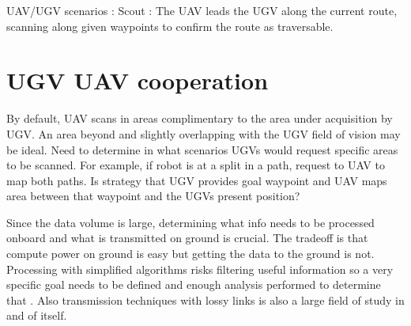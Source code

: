 \documentclass[a4paper,11pt]{report}
\begin{document}
UAV/UGV scenarios :
Scout : The UAV leads the UGV along the current route, scanning along given waypoints to confirm the route as traversable. 

\section{UGV UAV cooperation}

By default, UAV scans in areas complimentary to the area under acquisition by UGV. An area beyond and slightly overlapping with the UGV field of vision may be ideal. Need to determine in what scenarios UGVs would request specific areas to be scanned. For example, if robot is at a split in a path, request to UAV to map both paths. Is strategy that UGV provides goal waypoint and UAV maps area between that waypoint and the UGVs present position?

 Since the data volume is large, determining what info needs to be processed onboard and what is transmitted on ground is crucial. The tradeoff is that compute power on ground is easy but getting the data to the ground is not. Processing with simplified algorithms risks filtering useful information so a very specific goal needs to be defined and enough analysis performed to determine that . Also transmission techniques with lossy links is also a large field of study in and of itself. 
\end{document}
